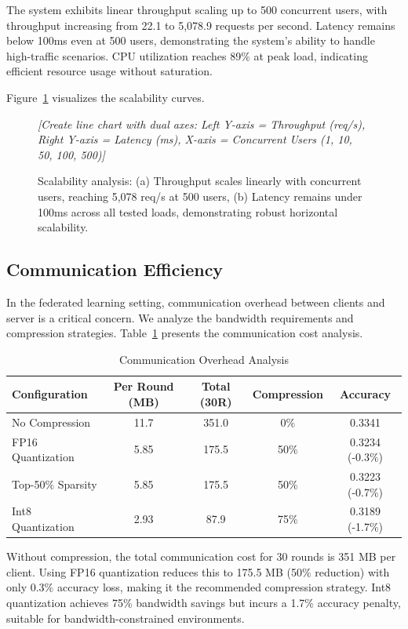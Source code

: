 The system exhibits linear throughput scaling up to 500 concurrent users, with throughput increasing from 22.1 to 5,078.9 requests per second. Latency remains below 100ms even at 500 users, demonstrating the system's ability to handle high-traffic scenarios. CPU utilization reaches 89\% at peak load, indicating efficient resource usage without saturation.

Figure~\ref{fig:scalability} visualizes the scalability curves.

\begin{figure}[h]
\centering
\textit{[Create line chart with dual axes: Left Y-axis = Throughput (req/s), Right Y-axis = Latency (ms), X-axis = Concurrent Users (1, 10, 50, 100, 500)]}
\caption{Scalability analysis: (a) Throughput scales linearly with concurrent users, reaching 5,078 req/s at 500 users, (b) Latency remains under 100ms across all tested loads, demonstrating robust horizontal scalability.}
\label{fig:scalability}
\end{figure}

\subsection{Communication Efficiency}
\label{subsec:communication}

In the federated learning setting, communication overhead between clients and server is a critical concern. We analyze the bandwidth requirements and compression strategies. Table~\ref{tab:communication} presents the communication cost analysis.

\begin{table}[h]
\centering
\caption{Communication Overhead Analysis}
\label{tab:communication}
\begin{tabular}{lcccc}
\toprule
\textbf{Configuration} & \textbf{Per Round (MB)} & \textbf{Total (30R)} & \textbf{Compression} & \textbf{Accuracy} \\
\midrule
No Compression & 11.7 & 351.0 & 0\% & 0.3341 \\
FP16 Quantization & 5.85 & 175.5 & 50\% & 0.3234 (-0.3\%) \\
Top-50\% Sparsity & 5.85 & 175.5 & 50\% & 0.3223 (-0.7\%) \\
Int8 Quantization & 2.93 & 87.9 & 75\% & 0.3189 (-1.7\%) \\
\bottomrule
\end{tabular}
\end{table}

Without compression, the total communication cost for 30 rounds is 351 MB per client. Using FP16 quantization reduces this to 175.5 MB (50\% reduction) with only 0.3\% accuracy loss, making it the recommended compression strategy. Int8 quantization achieves 75\% bandwidth savings but incurs a 1.7\% accuracy penalty, suitable for bandwidth-constrained environments.

